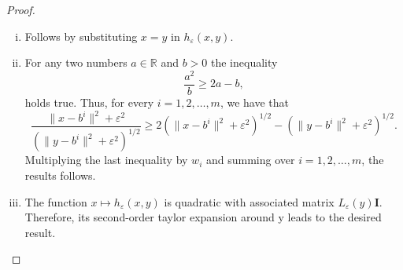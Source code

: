 \documentclass[11pt]{article}
\numberwithin{equation}{section}
\begin{document}
\begin{proof}
\begin{enumerate}[(i)]
	\item Follows by substituting $x=y$ in $h_{\varepsilon}(x,y)$.
	\item For any two numbers $a \in \mathbb{R}$ and $b>0$ the inequality 
	\begin{equation*}
		\frac{a^2}{b} \geq 2a - b ,
	\end{equation*}
	holds true. Thus, for every $i=1,2, \ldots ,m$, we have that
	\begin{equation*}
		\frac{\|x-b^i\|^2 + {\varepsilon}^2}{\left( \|y-b^i\|^2 + {\varepsilon}^2 \right)^{1/2}} \geq 2\left( \|x-b^i\|^2 + {\varepsilon}^2 \right)^{1/2} - \left( \|y-b^i\|^2 + {\varepsilon}^2 \right)^{1/2} .
	\end{equation*}
	Multiplying the last inequality by $w_i$ and summing over $i=1,2, \ldots, m$, the results follows. 
	\item The function $x \mapsto h_{\varepsilon}(x,y)$ is quadratic with associated matrix $L_{\varepsilon}(y)\textbf{I}$. Therefore, its second-order taylor expansion around y leads to the desired result.
\end{enumerate}
\end{proof}
\end{document}
